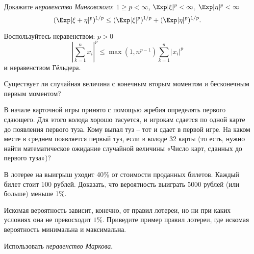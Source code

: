 \begin{problem}
Докажите \textit{неравенство Минковского}: $1 \geq p < \infty$, $\Exp |\xi|^p < \infty$, $\Exp |\eta|^p < \infty$  
\[
(\Exp |\xi + \eta |^p)^{1/p} \leq (\Exp |\xi|^p)^{1/p} + (\Exp |\eta|^p)^{1/p}. 
\]
\end{problem}

\begin{ordre}
Воспользуйтесь неравенством: $p > 0$ 
\[
\left| \sum \limits_{k=1}^n x_i \right|^p \leq \max(1, n^{p-1}) \sum \limits_{k=1}^n |x_i|^p  
\]
и неравенством Гёльдера.
\end{ordre}

\begin{problem}
Существует ли случайная величина с конечным вторым моментом и бесконечным первым моментом?
\end{problem}

\begin{problem}
В начале карточной игры принято с помощью жребия определять первого сдающего. Для этого колода хорошо тасуется, и игрокам сдается по одной карте до появления первого туза. Кому выпал туз -- тот и сдает в первой игре. На каком месте в среднем появляется первый туз, если в колоде 32 карты (то есть, нужно найти математическое ожидание случайной величины «Число карт, сданных до первого туза»)?
\end{problem}



\begin{problem}

 В лотерее на выигрыш уходит 40\% от стоимости проданных билетов. Каждый билет стоит 100 рублей. Доказать, что вероятность выиграть 5000 рублей (или больше) меньше 1\%.

Искомая вероятность зависит, конечно, от правил лотереи, но ни при каких условиях она не превосходит $1\%$.
Приведите пример правил лотереи, где искомая вероятность минимальна и максимальна.

\begin{ordre} 
Использовать \textit{неравенство Маркова}.
\end{ordre}

\end{problem}

